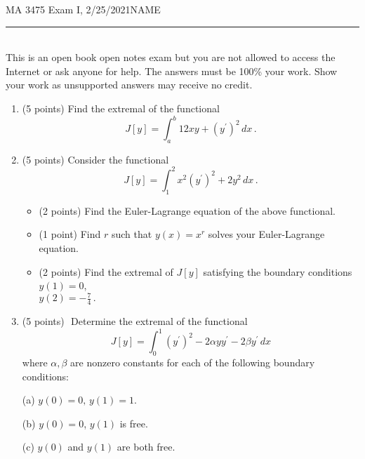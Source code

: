 \documentclass[12pt]{article}
\begin{document}
\noindent MA 3475\,\,Exam I, 2/25/2021\hfill NAME
\rule{6cm}{1pt}\\

This is an open book open notes exam but you are not allowed to access the Internet or ask anyone for help. The answers must be 100\% your work. Show your work as unsupported answers may receive no credit. 

\begin{enumerate}
\item (5 points)\,\,Find the extremal of the functional
$$
J[y] = \int_a^b 12xy + (y^{\prime})^2\,dx\,.
$$
\newpage
\item (5 points)\,\,Consider the functional
$$
J[y] = \displaystyle\int_1^2 x^2(y^{\prime})^2 + 2y^2\,dx\,.
$$
\begin{itemize}
\item (2 points)\,\,Find the Euler-Lagrange equation of the above functional.\vspace{3in}

\item (1 point)\,\,Find $r$ such that $y(x) = x^r$ solves your Euler-Lagrange equation.\vspace{1.5in}

\item (2 points)\,\,Find the extremal of $J[y]$ satisfying the boundary conditions $y(1) = 0$, \\
$y(2) = -\frac{7}{4}\,.$
\end{itemize}
\newpage
\item (5 points)\,\,
Determine the extremal of the functional
$$
J[y] = \int_0^1 (y^{\prime})^2 - 2\alpha y y^{\prime} - 2\beta y^{\prime}\,dx
$$
where $\alpha, \beta$ are nonzero constants for each of the following boundary conditions:\vspace{3in}

\noindent (a)\,\,$y(0) = 0, \,y(1) = 1$.\vspace{1in}

\noindent (b)\,\,$y(0) = 0$, $y(1)$ is free.\vspace{1in}

\noindent (c)\,\,$y(0)$ and $y(1)$ are both free.

\end{enumerate}
\end{document}
